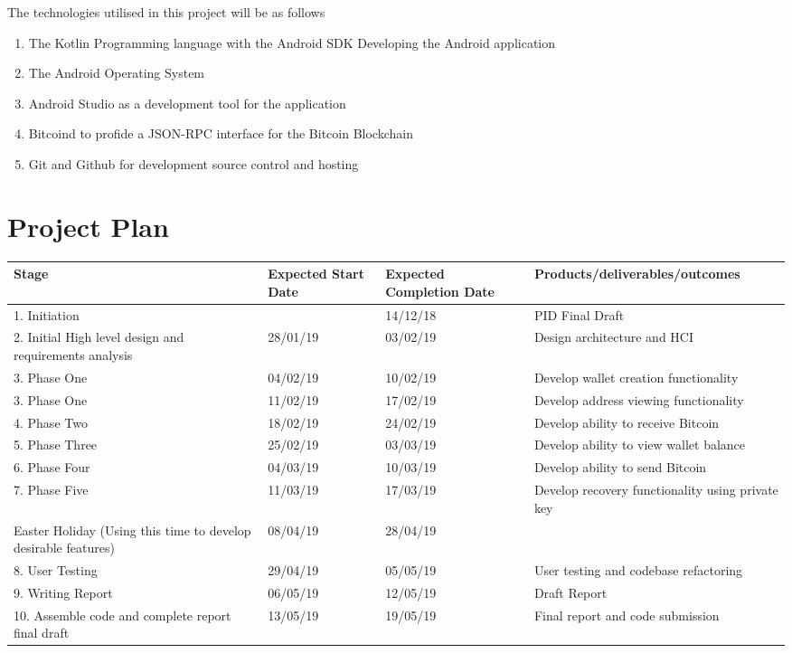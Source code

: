 \documentclass[11pt]{article}
\begin{document}
The technologies utilised in this project will be as follows
\begin{enumerate}
\item The Kotlin Programming language with the Android SDK Developing the Android application
\label{sec:orgdadfabb}
\item The Android Operating System
\label{sec:org2e16f9a}
\item Android Studio as a development tool for the application
\label{sec:orgfd67cc8}
\item Bitcoind to profide a JSON-RPC interface for the Bitcoin Blockchain
\label{sec:org9f0d7a6}
\item Git and Github for development source control and hosting
\label{sec:org52ec42d}
\end{enumerate}

\section{Project Plan}
\label{sec:orge057bc7}
\begin{adjustbox}{width={\textwidth},keepaspectratio}
\centering
\begin{center}
\begin{tabular}{|l|l|l|l|}
\hline
Stage & Expected Start Date & Expected Completion Date & Products/deliverables/outcomes\\
\hline
1. Initiation &  & 14/12/18 & PID Final Draft\\
2. Initial High level design and requirements analysis & 28/01/19 & 03/02/19 & Design architecture and HCI\\
3. Phase One & 04/02/19 & 10/02/19 & Develop wallet creation functionality\\
3. Phase One & 11/02/19 & 17/02/19 & Develop address viewing functionality\\
4. Phase Two & 18/02/19 & 24/02/19 & Develop ability to receive Bitcoin\\
5. Phase Three & 25/02/19 & 03/03/19 & Develop ability to view wallet balance\\
6. Phase Four & 04/03/19 & 10/03/19 & Develop ability to send Bitcoin\\
7. Phase Five & 11/03/19 & 17/03/19 & Develop recovery functionality using private key\\
Easter Holiday (Using this time to develop desirable features) & 08/04/19 & 28/04/19 & \\
8. User Testing & 29/04/19 & 05/05/19 & User testing and codebase refactoring\\
9. Writing Report & 06/05/19 & 12/05/19 & Draft Report\\
10. Assemble code and complete report final draft & 13/05/19 & 19/05/19 & Final report and code submission\\
\hline
\end{tabular}
\end{center}
\end{adjustbox}
\end{document}
